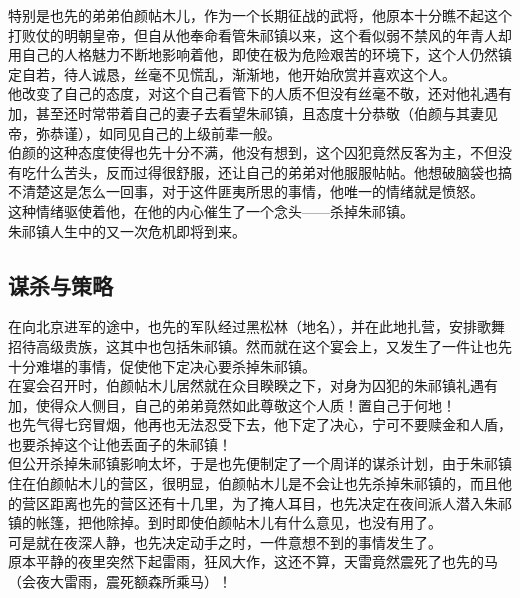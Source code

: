 \begin{multicols}{\theparacolNo}
特别是也先的弟弟伯颜帖木儿，作为一个长期征战的武将，他原本十分瞧不起这个打败仗的明朝皇帝，但自从他奉命看管朱祁镇以来，这个看似弱不禁风的年青人却用自己的人格魅力不断地影响着他，即使在极为危险艰苦的环境下，这个人仍然镇定自若，待人诚恳，丝毫不见慌乱，渐渐地，他开始欣赏并喜欢这个人。\\

他改变了自己的态度，对这个自己看管下的人质不但没有丝毫不敬，还对他礼遇有加，甚至还时常带着自己的妻子去看望朱祁镇，且态度十分恭敬（伯颜与其妻见帝，弥恭谨），如同见自己的上级前辈一般。\\

伯颜的这种态度使得也先十分不满，他没有想到，这个囚犯竟然反客为主，不但没有吃什么苦头，反而过得很舒服，还让自己的弟弟对他服服帖帖。他想破脑袋也搞不清楚这是怎么一回事，对于这件匪夷所思的事情，他唯一的情绪就是愤怒。\\

这种情绪驱使着他，在他的内心催生了一个念头——杀掉朱祁镇。\\

朱祁镇人生中的又一次危机即将到来。\\

\subsection{谋杀与策略}
在向北京进军的途中，也先的军队经过黑松林（地名），并在此地扎营，安排歌舞招待高级贵族，这其中也包括朱祁镇。然而就在这个宴会上，又发生了一件让也先十分难堪的事情，促使他下定决心要杀掉朱祁镇。\\

在宴会召开时，伯颜帖木儿居然就在众目睽睽之下，对身为囚犯的朱祁镇礼遇有加，使得众人侧目，自己的弟弟竟然如此尊敬这个人质！置自己于何地！\\

也先气得七窍冒烟，他再也无法忍受下去，他下定了决心，宁可不要赎金和人盾，也要杀掉这个让他丢面子的朱祁镇！\\

但公开杀掉朱祁镇影响太坏，于是也先便制定了一个周详的谋杀计划，由于朱祁镇住在伯颜帖木儿的营区，很明显，伯颜帖木儿是不会让也先杀掉朱祁镇的，而且他的营区距离也先的营区还有十几里，为了掩人耳目，也先决定在夜间派人潜入朱祁镇的帐篷，把他除掉。到时即使伯颜帖木儿有什么意见，也没有用了。\\

可是就在夜深人静，也先决定动手之时，一件意想不到的事情发生了。\\

原本平静的夜里突然下起雷雨，狂风大作，这还不算，天雷竟然震死了也先的马（会夜大雷雨，震死额森所乘马）！\\


\end{multicols}
